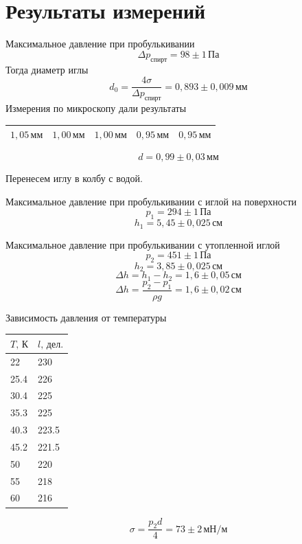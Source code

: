 \section{Результаты измерений}

Максимальное давление при пробулькивании
\[\Delta p_\text{спирт}=98\pm 1\,\text{Па}\]
Тогда диаметр иглы
\[d_0 = \frac{4\sigma}{\Delta p_\text{спирт}} = 0{,}893\pm0{,}009\,\text{мм}\]
Измерения по микроскопу дали результаты
\begin{table}[ht!]
    \centering
    \begin{tabular}{|l|l|l|l|l|}
    \hline
    $1{,}05\,\text{мм}$ & $1{,}00\,\text{мм}$ & $1{,}00\,\text{мм}$ & $0{,}95\,\text{мм}$ & $0{,}95\,\text{мм}$ \\ \hline
    \end{tabular}
\end{table}
\[d = 0{,}99\pm0{,}03\,\text{мм}\]

Перенесем иглу в колбу с водой.

Максимальное давление при пробулькивании с иглой на поверхности
\[p_1 = 294\pm 1\,\text{Па}\]
\[h_1 = 5{,}45\pm 0{,}025\,\text{см}\]

Максимальное давление при пробулькивании с утопленной иглой
\[p_2 = 451\pm 1\,\text{Па}\]
\[h_2 = 3{,}85\pm 0{,}025\,\text{см}\] 
\[\Delta h = h_1 - h_2 = 1{,}6\pm 0{,}05\,\text{см}\]
\[\Delta h = \frac{p_2 - p_1}{\rho g} = 1{,}6\pm 0{,}02\,\text{см}\]

Зависимость давления от температуры
\begin{table}[!ht]
    \centering
    \begin{tabular}{|l|l|}
    \hline
        $T,\,\text{К}$ & $l,\,\text{дел.}$ \\ \hline
        22 & 230 \\ \hline
        25.4 & 226 \\ \hline
        30.4 & 225 \\ \hline
        35.3 & 225 \\ \hline
        40.3 & 223.5 \\ \hline
        45.2 & 221.5 \\ \hline
        50 & 220 \\ \hline
        55 & 218 \\ \hline
        60 & 216 \\ \hline
    \end{tabular}
\end{table}

\[\sigma = \frac{p_2 d}{4} = 73\pm 2\,\text{мН}/\text{м}\]

